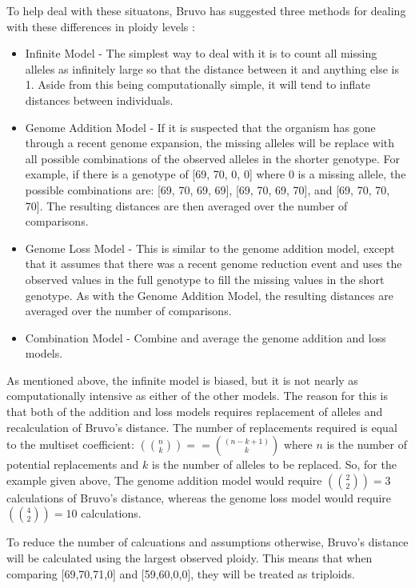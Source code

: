 \documentclass[letterpaper]{article}
\begin{document}
To help deal with these situatons, Bruvo has suggested three methods for dealing with these differences in ploidy levels \cite{Bruvo:2004}:
\begin{itemize}
  \item{Infinite Model -} The simplest way to deal with it is to count all missing alleles as infinitely large so that the distance between it and anything else is 1. Aside from this being computationally simple, it will tend to inflate distances between individuals. 
  \item{Genome Addition Model -} If it is suspected that the organism has gone through a recent genome expansion, the missing alleles will be replace with all possible combinations of the observed alleles in the shorter genotype. For example, if there is a genotype of [69, 70, 0, 0] where 0 is a missing allele, the possible combinations are: [69, 70, 69, 69], [69, 70, 69, 70], and [69, 70, 70, 70]. The resulting distances are then averaged over the number of comparisons. 
  \item{Genome Loss Model -} This is similar to the genome addition model, except that it assumes that there was a recent genome reduction event and uses the observed values in the full genotype to fill the missing values in the short genotype. As with the Genome Addition Model, the resulting distances are averaged over the number of comparisons.
  \item{Combination Model -} Combine and average the genome addition and loss models.
\end{itemize}

As mentioned above, the infinite model is biased, but it is not nearly as computationally intensive as either of the other models. The reason for this is that both of the addition and loss models requires replacement of alleles and recalculation of Bruvo's distance. The number of replacements required is equal to the multiset coefficient: $\left({n \choose k}\right) == {(n-k+1) \choose k}$ where $n$ is the number of potential replacements and $k$ is the number of alleles to be replaced. So, for the example given above, The genome addition model would require $\left({2 \choose 2}\right) = 3$ calculations of Bruvo's distance, whereas the genome loss model would require $\left({4 \choose 2}\right) = 10$ calculations. 

To reduce the number of calcuations and assumptions otherwise, Bruvo's distance will be calculated using the largest observed ploidy. This means that when comparing [69,70,71,0] and [59,60,0,0], they will be treated as triploids.
\end{document}
